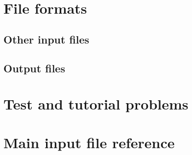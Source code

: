 \documentclass[12pt,a4paper]{report}
\begin{document}




\chapter{File formats}


\section{Other input files}



\section{Output files}

% 
%   


\chapter{Test and tutorial problems}


\chapter{Main input file reference}





\end{document}
